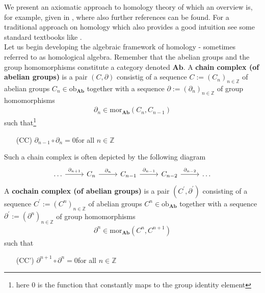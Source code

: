 We present an axiomatic approach to homology theory of which an overview is, for example, given in \cite{35c5a183}, where also further references can be found. For a traditional approach on homology which also provides a good intuition see some standard textbooks like \cite{8b5861fc}.
\\
Let us begin developing the algebraic framework of homology - sometimes referred to as homological algebra. Remember that the abelian groups and the group homomorphisms constitute a category denoted $\mathbf{Ab}$. A \textbf{chain complex (of abelian groups)} is a pair $(C,\partial)$ consistig of a sequence $C := (C_{n})_{n\in\mathbb{Z}}$ of abelian groups $C_{n} \in \mathrm{ob}_{\mathbf{Ab}}$ together with a sequence $\partial := (\partial_{n})_{n\in\mathbb{Z}}$ of group homomorphisms
\begin{align*}
  \partial_{n}
  \in
  \mathrm{mor}_{\mathbf{Ab}}(C_{n},C_{n-1})
\end{align*}
such that\footnote{here $0$ is the function that constantly maps to the group identity element}
\begin{enumerate}
\item[(CC)]
$\partial_{n-1} \circ \partial_{n} = 0$\qquad for all $n \in \mathbb{Z}$
\end{enumerate}
Such a chain complex is often depicted by the following diagram
\begin{equation*}
\begin{tikzcd}[row sep=2.2em,column sep=2.6em]
  \ldots
  \ar{r}{\partial_{n+1}}
  &
  C_{n}
  \ar{r}{\partial_{n}}
  &
  C_{n-1}
  \ar{r}{\partial_{n-1}}
  &
  C_{n-2}
  \ar{r}{\partial_{n-2}}
  &
  \ldots
\end{tikzcd}
\end{equation*}
A \textbf{cochain complex (of abelian groups)} is a pair $(C^{\prime},\partial^{\prime})$ consisting of a sequence $C^{\prime} := (C^{n})_{n\in\mathbb{Z}}$ of abelian groups $C^{n} \in \mathrm{ob}_{\mathbf{Ab}}$ together with a sequence $\partial^{\prime} := (\partial^{n})_{n\in\mathbb{Z}}$ of group homomorphisms
\begin{align*}
  \partial^{n}
  \in
  \mathrm{mor}_{\mathbf{Ab}}(C^{n},C^{n+1})
\end{align*}  
such that
\begin{enumerate}
\item[(CC')]
$\partial^{n+1} \circ \partial^{n} = 0$\qquad for all $n \in \mathbb{Z}$
\end{enumerate}
